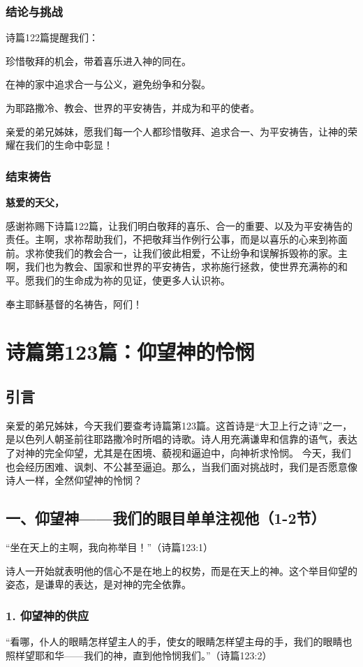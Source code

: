 \documentclass[a4paper, 12pt]{article}
\begin{document}
\subsubsection*{结论与挑战}
诗篇122篇提醒我们：

珍惜敬拜的机会，带着喜乐进入神的同在。

在神的家中追求合一与公义，避免纷争和分裂。

为耶路撒冷、教会、世界的平安祷告，并成为和平的使者。

亲爱的弟兄姊妹，愿我们每一个人都珍惜敬拜、追求合一、为平安祷告，让神的荣耀在我们的生命中彰显！

\subsubsection*{结束祷告}
\textbf{慈爱的天父，}

感谢祢赐下诗篇122篇，让我们明白敬拜的喜乐、合一的重要、以及为平安祷告的责任。主啊，求祢帮助我们，不把敬拜当作例行公事，而是以喜乐的心来到祢面前。求祢使我们的教会合一，让我们彼此相爱，不让纷争和误解拆毁祢的家。主啊，我们也为教会、国家和世界的平安祷告，求祢施行拯救，使世界充满祢的和平。愿我们的生命成为祢的见证，使更多人认识祢。

奉主耶稣基督的名祷告，阿们！
\newpage
\section{诗篇第123篇：仰望神的怜悯}
\subsection*{引言}
亲爱的弟兄姊妹，今天我们要查考诗篇第123篇。这首诗是“大卫上行之诗”之一，是以色列人朝圣前往耶路撒冷时所唱的诗歌。诗人用充满谦卑和信靠的语气，表达了对神的完全仰望，尤其是在困境、藐视和逼迫中，向神祈求怜悯。
今天，我们也会经历困难、讽刺、不公甚至逼迫。那么，当我们面对挑战时，我们是否愿意像诗人一样，全然仰望神的怜悯？

\subsection*{一、仰望神——我们的眼目单单注视他（1-2节）}
“坐在天上的主啊，我向祢举目！”（诗篇123:1）

诗人一开始就表明他的信心不是在地上的权势，而是在天上的神。这个举目仰望的姿态，是谦卑的表达，是对神的完全依靠。

\subsubsection*{1. 仰望神的供应}
“看哪，仆人的眼睛怎样望主人的手，使女的眼睛怎样望主母的手，我们的眼睛也照样望耶和华——我们的神，直到他怜悯我们。”（诗篇123:2）
\end{document}
